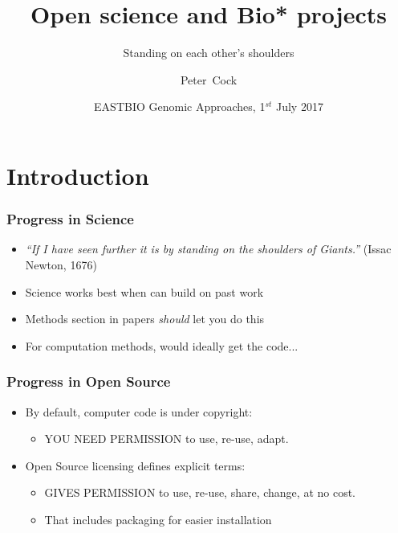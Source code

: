 


\title[Open science and Bio* projects] %
{Open science and Bio* projects}
\subtitle{Standing on each other's shoulders}
\author[Cock] %
{Peter~Cock}
\date[July 2017] %
{EASTBIO Genomic Approaches, 1$^{st}$ July 2017}
\subject{Bioinformatics}





\frame[plain]{\titlepage}

\section{Introduction}

\begin{frame}
  \frametitle{Progress in Science}
  \begin{itemize}
    \item \emph{``If I have seen further it is by standing on the shoulders of Giants.''} (Issac Newton, 1676)
    \item Science works best when can build on past work
    \item Methods section in papers \emph{should} let you do this
    \item For computation methods, would ideally get the code...
  \end{itemize}
\end{frame}

\begin{frame}
  \frametitle{Progress in Open Source}
  \begin{itemize}
    \item By default, computer code is under copyright:
      \begin{itemize}
        \item YOU NEED PERMISSION to use, re-use, adapt.
      \end{itemize}
    \item Open Source licensing defines explicit terms:
      \begin{itemize}
        \item GIVES PERMISSION to use, re-use, share, change, at no cost.
        \item That includes packaging for easier installation
      \end{itemize}
  \end{itemize}
\end{frame}

